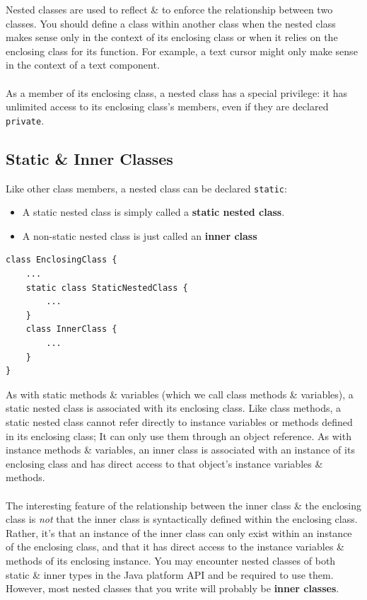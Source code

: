\documentclass[a4paper,11pt]{article}
\begin{document}
Nested classes are used to reflect \& to enforce the relationship between two classes. 
You should define a class within another class when the nested class makes sense only in the context of its enclosing 
class or when it relies on the enclosing class for its function. 
For example, a text cursor might only make sense in the context of a text component. 
\\\\
As a member of its enclosing class, a nested class has a special privilege: it has unlimited access to its enclosing 
class's members, even if they are declared \verb|private|. 

\subsection{Static \& Inner Classes}
Like other class members, a nested class can be declared \verb|static|:
\begin{itemize}
    \item   A static nested class is simply called a \textbf{static nested class}.
    \item   A non-static nested class is just called an \textbf{inner class}
\end{itemize}
\begin{verbatim}
class EnclosingClass {
    ...
    static class StaticNestedClass {
        ...
    }
    class InnerClass {
        ...
    }
}
\end{verbatim}

As with static methods \& variables (which we call class methods \& variables), a static nested class is associated with 
its enclosing class. 
Like class methods, a static nested class cannot refer directly to instance variables or methods defined in its 
enclosing class; It can only use them through an object reference.
As with instance methods \& variables, an inner class is associated with an instance of its enclosing class and has
direct access to that object's instance variables \& methods.
\\\\
The interesting feature of the relationship between the inner class \& the enclosing class is \emph{not} that the inner
class is syntactically defined within the enclosing class. 
Rather, it's that an instance of the inner class can only exist within an instance of the enclosing class, and that it 
has direct access to the instance variables \& methods of its enclosing instance. 
You may encounter nested classes of both static \& inner types in the Java platform API and be required to use them. 
However, most nested classes that you write will probably be \textbf{inner classes}.
\end{document}
